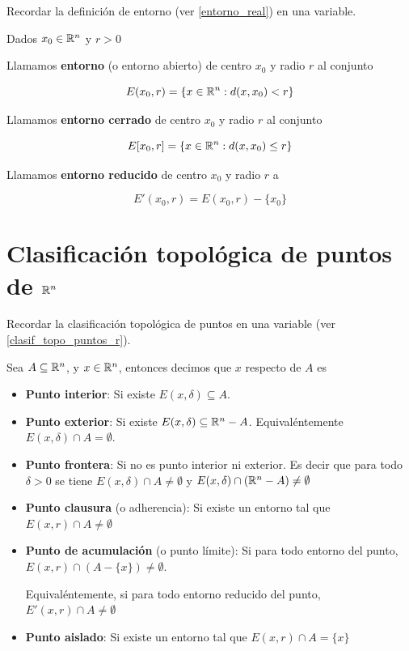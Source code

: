 Recordar la definición de entorno (ver \ref{entorno_real}) en una variable.

\begin{definition}[Entorno]
Dados $x_0 \in \mathbb{R}^n$ y $r > 0$ 

Llamamos \textbf{entorno}  (o entorno abierto) de centro $x_0$ y radio $r$ al conjunto

$$ E(x_0,r) = \{ x \in \mathbb{R}^n : d(x,x_0) < r\} $$

Llamamos \textbf{entorno cerrado} de centro $x_0$ y radio $r$ al conjunto

$$ E[x_0,r] = \{ x \in \mathbb{R}^n : d(x,x_0) \leq r\} $$

Llamamos \textbf{entorno reducido} de centro $x_0$ y radio $r$ a 

$$ E'(x_0,r) = E(x_0,r) - \{x_0\}$$
\end{definition}

\section{Clasificación topológica de puntos de $\mathbb{R}^n$}

Recordar la clasificación topológica de puntos en una variable (ver \ref{clasif_topo_puntos_r}).

\begin{definition}[Puntos]

Sea $A \subseteq \mathbb{R}^n$, y $x \in \mathbb{R}^n$, entonces decimos que $x$ respecto de $A$ es 

\begin{itemize}
\item \textbf{Punto interior}: Si existe $E(x,\delta) \subseteq A$.

\item \textbf{Punto exterior}: Si existe $E(x,\delta) \subseteq \mathbb{R}^n - A$.  Equivaléntemente $E(x,\delta) \cap A = \emptyset$.

\item \textbf{Punto frontera}: Si no es punto interior ni exterior.  Es decir que para todo $ \delta > 0$ se tiene $E(x,\delta) \cap A \neq \emptyset$ y $E(x,\delta) \cap (\mathbb{R}^n - A) \neq \emptyset$

\item \textbf{Punto clausura} (o adherencia): Si existe un entorno tal que $E(x,r) \cap A \neq \emptyset$

\item \textbf{Punto de acumulación} (o punto límite): Si para todo entorno del punto, $ E(x,r) \cap (A - \{x\}) \neq \emptyset$.

Equivaléntemente, si para todo entorno reducido del punto, $ E'(x,r) \cap A \neq \emptyset$

\item \textbf{Punto aislado}: Si existe un entorno tal que $E(x,r) \cap A = \{x\}$
\end{itemize}
\end{definition}

